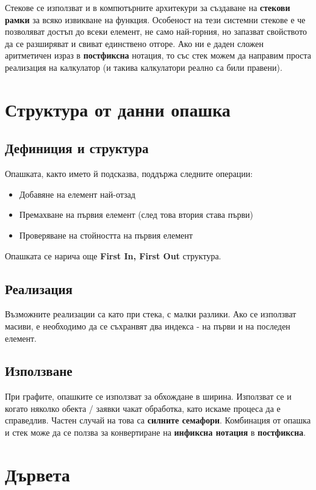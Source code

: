 \documentclass[fleqn,12pt]{article}
\begin{document}
Стекове се използват и в компютърните архитекури за създаване на \textbf{стекови рамки} за всяко извикване на функция. Особеност на 
тези системни стекове е че позволяват достъп до всеки елемент, не само най-горния, но запазват свойството да се разширяват и свиват
единствено отгоре. Ако ни е даден сложен аритметичен израз в \textbf{постфиксна} нотация, то със стек можем да направим проста реализация на калкулатор
(и такива калкулатори реално са били правени).

\section{Структура от данни опашка}
\subsection{Дефиниция и структура}
Опашката, както името й подсказва, поддържа следните операции:
\begin{itemize}
    \item Добавяне на елемент най-отзад
    \item Премахване на първия елемент (след това втория става първи)
    \item Проверяване на стойността на първия елемент
\end{itemize}

Опашката се нарича още \textbf{First In, First Out} структура.

\subsection{Реализация}
Възможните реализации са като при стека, с малки разлики. Ако се използват масиви, е необходимо да се съхранвят два индекса - на първи и на последен елемент.

\subsection{Използване}
При графите, опашките се използват за обхождане в ширина. Използват се и когато няколко обекта / заявки чакат обработка, като искаме процеса да е справедлив.
Частен случай на това са \textbf{силните семафори}. Комбинация от опашка и стек може да се ползва за конвертиране на \textbf{инфиксна нотация} в \textbf{постфиксна}.

\section{Дървета}
\end{document}
